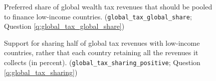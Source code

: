 \begin{figure}[h!]
    \cprotect\caption[Preferred share of global tax for low-income countries]{Preferred share of global wealth tax revenues that should be pooled to finance low-income countries. (\verb|global_tax_global_share|; Question \ref{q:global_tax_global_share})}\label{fig:global_tax_global_share}
\end{figure}

\begin{figure}[h!]
    \cprotect\caption[Support for sharing half of global tax revenues with low-income countries]{Support for sharing half of global tax revenues with low-income countries, rather that each country retaining all the revenues it collects (in percent). (\verb|global_tax_sharing_positive|; Question \ref{q:global_tax_sharing})}\label{fig:global_tax_sharing}
\end{figure}


